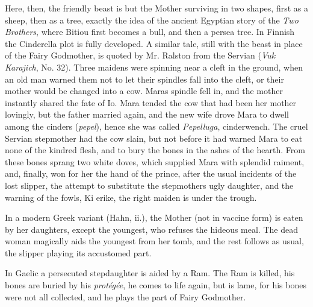 \documentclass[14pt,a4paper]{memoir}
\begin{document}
{Here, then, the friendly beast is but the Mother surviving in two
shapes, first as a sheep, then as a tree, exactly the idea of the
ancient Egyptian story of the \emph{Two Brothers}, where Bitiou first
becomes a bull, and then a persea
tree.
In Finnish the Cinderella plot is fully developed. A similar tale, still
with the beast in place of the Fairy Godmother, is quoted by Mr. Ralston
from the Servian (\emph{Vuk Karajich}, No. 32). Three maidens were
spinning near a cleft in the ground, when an old man warned them not to
let their spindles fall into the cleft, or their mother would be changed
into a cow. Mara\textquotesingle s spindle fell in, and the mother
instantly shared the fate of Io. Mara tended the cow that had been her
mother lovingly, but the father married again, and the new wife drove
Mara to dwell among the cinders (\emph{pepel}), hence she was called
\emph{Pepelluga},
cinderwench.
The cruel Servian stepmother had the cow slain, but not before it had
warned Mara to eat none of the kindred
flesh,
and to bury the bones in the ashes of the hearth. From these bones
sprang two white doves, which supplied Mara with splendid raiment, and,
finally, won for her the hand of the prince, after the usual incidents
of the lost slipper, the attempt to substitute the
stepmother\textquotesingle s ugly daughter, and the warning of the
fowls, \textquotesingle Ki erike, the right maiden is under the
trough.\textquotesingle{}

In a modern Greek variant (Hahn, ii.), the Mother (not in vaccine form)
is eaten by her daughters, except the youngest, who refuses the hideous
meal. The dead woman magically aids the youngest from her tomb, and the
rest follows as usual, the slipper playing its accustomed part.

In Gaelic a persecuted stepdaughter is aided by a Ram. The Ram is
killed, his bones are buried by his \emph{protégée}, he comes to life
again, but is lame, for his bones were not all collected, and he plays
the part of Fairy
Godmother.

}
\end{document}
